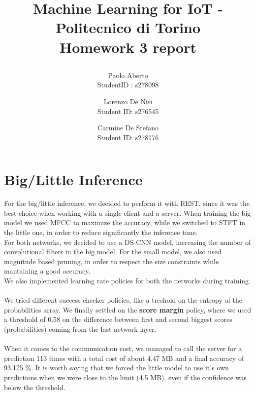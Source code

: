 \documentclass{article}
\date{}
\begin{document}
\author{Paolo Aberto\\
StudentID : s278098\\

\and
Lorenzo De Nisi\\
Student ID: s276545\\

\and
Carmine De Stefano\\
Student ID: s278176\\
}

\justifying

\title{
    \vspace{0.4cm}
    
    Machine Learning for IoT - 
    Politecnico di Torino\\
    \vspace{.5cm}
    \Large \textbf{Homework 3 report}
    \vspace{0cm}
}

\maketitle
\thispagestyle{empty} 
\vspace{-1cm}


\section{Big/Little Inference}
For the big/little inference, we decided to perform it with REST, since it was the best choice when working with a single client and a server.
When training the big model we used MFCC to maximize the accuracy, while we switched to STFT in the little one, in order to reduce significantly the inference time.
\\
For both networks, we decided to use a DS-CNN model, increasing the number of convolutional filters in the big model. For the small model, we also used magnitude based pruning, in order to respect the size constraints while mantaining a good accuracy.\\
We also implemented learning rate policies for both the networks during training.\\\\
We tried different success checker policies, like a treshold on the entropy of the probabilities array. We finally settled on the \textbf{score margin} policy, where we used a threshold of 0.58 on the difference between first and second biggest scores (probabilities) coming from the last network layer.
\\\\
When it comes to the communication cost, we managed to call the server for a prediction 113 times with a total cost of about 4.47 MB and a final accuracy of 93.125 \%.
It is worth saying that we forced the little model to use it's own predictions when we were close to the limit (4.5 MB), even if the confidence was below the threshold. 
\end{document}
